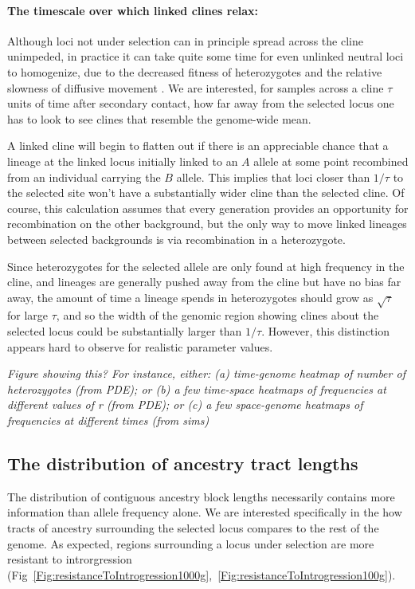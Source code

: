 \documentclass[12pt]{article}
\newcommand{\plr}[1]{{\em \color{blue} #1}}
\begin{document}
\paragraph{The timescale over which linked clines relax:}
Although loci not under selection can in principle spread across the cline unimpeded,
in practice it can take quite some time for even unlinked neutral loci to homogenize,
due to the decreased fitness of heterozygotes \citep{Barton1986}
and the relative slowness of diffusive movement \citep{Sedghifar2015}.
We are interested, for samples across a cline $\tau$ units of time after secondary contact, how far away from the selected locus one has to look to see clines that resemble the genome-wide mean.


A linked cline will begin to flatten out if there is an appreciable chance that a lineage at the linked locus initially linked to an $A$ allele 
at some point recombined from an individual carrying the $B$ allele.
This implies that loci closer than $1/\tau$ to the selected site won't have a substantially wider cline than the selected cline.
Of course, this calculation assumes that every generation provides an opportunity for recombination on the other background, but the only way to move linked lineages between selected backgrounds is via recombination in a heterozygote. 

Since heterozygotes for the selected allele are only found at high frequency in the cline,
and lineages are generally pushed away from the cline but have no bias far away,
the amount of time a lineage spends in heterozygotes should grow as $\sqrt{\tau}$ for large $\tau$,
and so the width of the genomic region showing clines about the selected locus could be 
substantially larger than $1/\tau$. However, this distinction appears hard to observe for realistic parameter values.



\plr{Figure showing this? 
    For instance, either: (a) time-genome heatmap of number of heterozygotes (from PDE);
    or (b) a few time-space heatmaps of frequencies at different values of r (from PDE);
    or (c) a few space-genome heatmaps of frequencies at different times (from sims)
}




\subsection*{The distribution of ancestry tract lengths}
The distribution of contiguous ancestry block lengths necessarily contains more information than allele frequency alone. We are interested specifically in the how tracts of ancestry surrounding the selected locus compares to the rest of the genome. As expected, regions surrounding a locus under selection are more resistant to introrgression (Fig~\ref{Fig:resistanceToIntrogression1000g},~\ref{Fig:resistanceToIntrogression100g}). 
\end{document}
